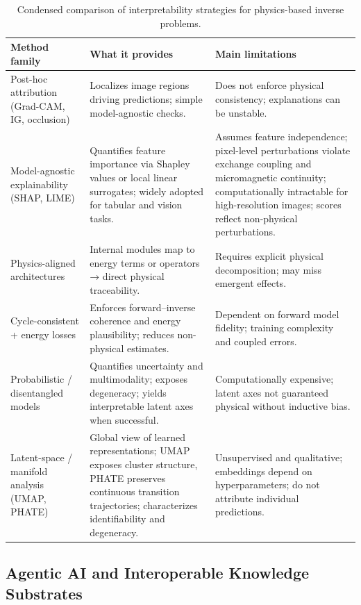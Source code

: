 \documentclass[letterpaper, 12, one column]{article}
\renewcommand{\arraystretch}{1.15}
\begin{document}
\begin{table}[H]
\centering
\footnotesize
\renewcommand{\arraystretch}{1.45}
\begin{tabular}{p{3.4cm} p{4.6cm} p{4.0cm}}
\hline
\textbf{Method family} & \textbf{What it provides} & \textbf{Main limitations} \\
\hline
Post-hoc attribution (Grad-CAM, IG, occlusion) & Localizes image regions driving predictions; simple model-agnostic checks. & Does not enforce physical consistency; explanations can be unstable. \\
\hline
Model-agnostic explainability (SHAP, LIME) & Quantifies feature importance via Shapley values or local linear surrogates; widely adopted for tabular and vision tasks. & Assumes feature independence; pixel-level perturbations violate exchange coupling and micromagnetic continuity; computationally intractable for high-resolution images; scores reflect non-physical perturbations. \\
\hline
Physics-aligned architectures & Internal modules map to energy terms or operators → direct physical traceability. & Requires explicit physical decomposition; may miss emergent effects. \\
\hline
Cycle-consistent + energy losses & Enforces forward–inverse coherence and energy plausibility; reduces non-physical estimates. & Dependent on forward model fidelity; training complexity and coupled errors. \\
\hline
Probabilistic / disentangled models & Quantifies uncertainty and multimodality; exposes degeneracy; yields interpretable latent axes when successful. & Computationally expensive; latent axes not guaranteed physical without inductive bias. \\
\hline
Latent-space / manifold analysis (UMAP, PHATE) & Global view of learned representations; UMAP exposes cluster structure, PHATE preserves continuous transition trajectories; characterizes identifiability and degeneracy. & Unsupervised and qualitative; embeddings depend on hyperparameters; do not attribute individual predictions. \\
\hline
\end{tabular}
\caption{Condensed comparison of interpretability strategies for physics-based inverse problems.}
\label{tab:interpretability_comparison}
\end{table}




\subsection{Agentic AI and Interoperable Knowledge Substrates}\label{sec:state_art_agents}
\end{document}
